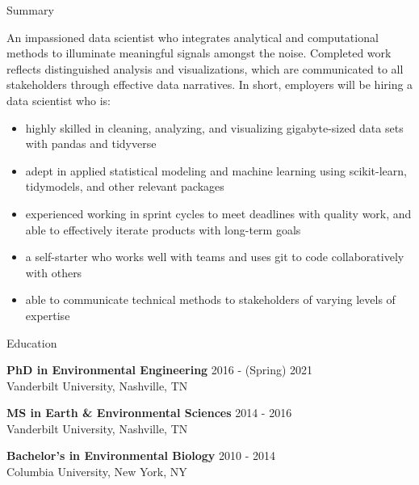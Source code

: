 \documentclass{resume} %
\begin{document}

\begin{rSection}{Summary}

An impassioned data scientist who integrates analytical and computational methods to illuminate meaningful signals amongst the noise. Completed work reflects distinguished analysis and visualizations, which are communicated to all stakeholders through effective data narratives. In short, employers will be hiring a data scientist who is:
{\begin{itemize}
    \item {highly skilled in cleaning, analyzing, and visualizing gigabyte-sized data sets with pandas and tidyverse}
    \item {adept in applied statistical modeling and machine learning using scikit-learn, tidymodels, and other relevant packages}
    \item {experienced working in sprint cycles to meet deadlines with quality work, and able to effectively iterate products with long-term goals}    
    \item {a self-starter who works well with teams and uses git to code collaboratively with others}
    \item {able to communicate technical methods to stakeholders of varying levels of expertise}
\end{itemize} }

\end{rSection}


\begin{rSection}{Education}

{\bf PhD in Environmental Engineering} \hfill {2016 - (Spring) 2021}
\\ 
Vanderbilt University, Nashville, TN 

{\bf MS in Earth \& Environmental Sciences}  \hfill {2014 - 2016}
\\
Vanderbilt University, Nashville, TN
 
{\bf Bachelor's in Environmental Biology}  \hfill {2010 - 2014}
\\
Columbia University, New York, NY

\end{rSection}
\end{document}
